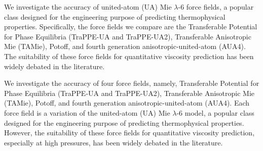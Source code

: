 \documentclass[preprint,review,12pt]{elsarticle}
\begin{document}
	
	
	

	 
	 We investigate the accuracy of united-atom (UA) Mie $\lambda$-6 force fields, a popular class designed for the engineering purpose of predicting thermophysical properties. Specifically, the force fields we compare are the Transferable Potential for Phase Equilibria (TraPPE-UA and TraPPE-UA2), Transferable Anisotropic Mie (TAMie), Potoff, and fourth generation anisotropic-united-atom (AUA4). The suitability of these force fields for quantitative viscosity prediction has been widely debated in the literature.
	 
	 We investigate the accuracy of four force fields, namely, Transferable Potential for Phase Equilibria (TraPPE-UA and TraPPE-UA2), Transferable Anisotropic Mie (TAMie), Potoff, and fourth generation anisotropic-united-atom (AUA4). Each force field is a variation of the united-atom (UA) Mie $\lambda$-6 model, a popular class designed for the engineering purpose of predicting thermophysical properties. However, the suitability of these force fields for quantitative viscosity prediction, especially at high pressures, has been widely debated in the literature.
	 
\end{document}
